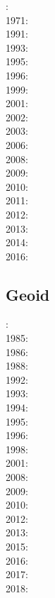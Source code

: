 {\scriptsize
{}: \cite{ramb70}\\
1971: \cite{ramb71}\\
1991: \cite{flet91}\\
1993: \cite{zhhj93}\\
1995: \cite{flet95}\\
1996: \cite{zhho96}\\
1999: \cite{nagg99}\\
2001: \cite{scpo01}\\
2002: \cite{mumh02}\\
2003: \cite{nagv03}\\
2006: \cite{frsc06}\\
2008: \cite{schm08}\cite{manc08}\cite{scdk08}\\
2009: \cite{simp09}\\
2010: \cite{resb10}\\
2011: \cite{freh11}\\
2012: \cite{reds12}\cite{grsc12}\cite{scsc12}\\
2013: \cite{regc13}\\
2014: \cite{freh14}\cite{frex14}\\
2016: \cite{frsc16}
}

\subsection{Geoid}

{\scriptsize
{}: \cite{davi84}\cite{hage84}\cite{riff84}\cite{riha84}\\
1985: \cite{hacr85}\\
1986: \cite{davi86}\\
1988: \cite{besz88}\cite{fope88}\\
1992: \cite{zhgu92}\cite{kiha92}\\
1993: \cite{zhch93}\cite{rirl93}\\
1994: \cite{kiha94}\\
1995: \cite{king95}\cite{mopa95}\\
1996: \cite{mogu96}\\
1998: \cite{cava98}\cite{chki98}\\
2001: \cite{zhon01}\\
2008: \cite{meco08}\\
2009: \cite{king09}\\
2010: \cite{ghbz10}\cite{spgs10b}\\
2012: \cite{hibi12}\\
2013: \cite{shsc13}\\
2015: \cite{lizh15}\\
2016: \cite{necg16}\\
2017: \cite{grab17}\\
2018: \cite{king18}
}

